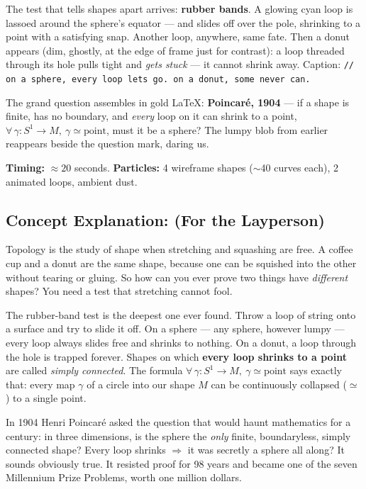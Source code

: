 \documentclass[11pt]{article}
\begin{document}
The test that tells shapes apart arrives: \textbf{rubber bands}. A glowing cyan loop
is lassoed around the sphere's equator --- and slides off over the pole, shrinking to
a point with a satisfying snap. Another loop, anywhere, same fate. Then a donut
appears (dim, ghostly, at the edge of frame just for contrast): a loop threaded
through its hole pulls tight and \emph{gets stuck} --- it cannot shrink away. Caption:
\texttt{// on a sphere, every loop lets go. on a donut, some never can.}

The grand question assembles in gold \LaTeX: \textbf{Poincar\'e, 1904} --- if a shape
is finite, has no boundary, and \emph{every} loop on it can shrink to a point,
\( \forall\,\gamma : S^1 \to M,\ \gamma \simeq \text{point} \), must it be a sphere?
The lumpy blob from earlier reappears beside the question mark, daring us.

\textbf{Timing:} $\approx 20$ seconds. \textbf{Particles:} 4 wireframe shapes
($\sim$40 curves each), 2 animated loops, ambient dust.

\subsection*{Concept Explanation: (For the Layperson)}

Topology is the study of shape when stretching and squashing are free. A coffee cup
and a donut are the same shape, because one can be squished into the other without
tearing or gluing. So how can you ever prove two things have \emph{different} shapes?
You need a test that stretching cannot fool.

The rubber-band test is the deepest one ever found. Throw a loop of string onto a
surface and try to slide it off. On a sphere --- any sphere, however lumpy --- every
loop always slides free and shrinks to nothing. On a donut, a loop through the hole
is trapped forever. Shapes on which \textbf{every loop shrinks to a point} are called
\emph{simply connected}. The formula \( \forall\,\gamma:S^1\to M,\ \gamma\simeq
\text{point} \) says exactly that: every map $\gamma$ of a circle into our shape $M$
can be continuously collapsed ($\simeq$) to a single point.

In 1904 Henri Poincar\'e asked the question that would haunt mathematics for a
century: in three dimensions, is the sphere the \emph{only} finite, boundaryless,
simply connected shape? Every loop shrinks $\Rightarrow$ it was secretly a sphere all
along? It sounds obviously true. It resisted proof for 98 years and became one of the
seven Millennium Prize Problems, worth one million dollars.
\end{document}
